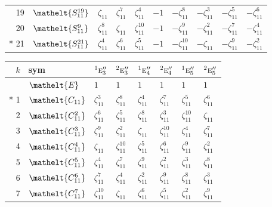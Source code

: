 \documentclass[10pt,a4paper]{article}
\numberwithin{equation}{section}
\newcommand{\eltfont}[1]{{\let\sigma\eltsigma\mathelt{#1}}}
\newcommand{\irr}[1]{\text{\normalfont\scshape #1}}
\newcommand{\conjpair}[1]{{}^{#1}}
\newcommand{\cls}[1]{\eltfont{#1}}
\newcommand{\rootunity}[1]{\zeta_{#1}}
\begin{document}
{\begin{longtable}{@{}rlllllllll@{}}
19 & $\cls{S_{11}^{19}}$ & $\rootunity{11}$ & $\rootunity{11}^{7}$ & $\rootunity{11}^{4}$ & $-1$ & $-\rootunity{11}^{8}$ & $-\rootunity{11}^{3}$ & $-\rootunity{11}^{5}$ & $-\rootunity{11}^{6}$\\
20 & $\cls{S_{11}^{9}}$ & $\rootunity{11}^{8}$ & $\rootunity{11}$ & $\rootunity{11}^{10}$ & $-1$ & $-\rootunity{11}^{9}$ & $-\rootunity{11}^{2}$ & $-\rootunity{11}^{7}$ & $-\rootunity{11}^{4}$\\*
21 & $\cls{S_{11}^{21}}$ & $\rootunity{11}^{4}$ & $\rootunity{11}^{6}$ & $\rootunity{11}^{5}$ & $-1$ & $-\rootunity{11}^{10}$ & $-\rootunity{11}$ & $-\rootunity{11}^{9}$ & $-\rootunity{11}^{2}$\\
\bottomrule\end{longtable}}
{\small\setlength{\tabcolsep}{4pt}
\begin{longtable}{@{}rlllllll@{}}\toprule
$k$ & sym & $\conjpair{1}\irr{e}_{3}''$ & $\conjpair{2}\irr{e}_{3}''$ & $\conjpair{1}\irr{e}_{4}''$ & $\conjpair{2}\irr{e}_{4}''$ & $\conjpair{1}\irr{e}_{5}''$ & $\conjpair{2}\irr{e}_{5}''$\\\midrule\endhead
\bottomrule\endfoot\endlastfoot
0 & $\cls{E}$ & $1$ & $1$ & $1$ & $1$ & $1$ & $1$\\*
1 & $\cls{C_{11}}$ & $\rootunity{11}^{3}$ & $\rootunity{11}^{8}$ & $\rootunity{11}^{4}$ & $\rootunity{11}^{7}$ & $\rootunity{11}^{5}$ & $\rootunity{11}^{6}$\\
2 & $\cls{C_{11}^{2}}$ & $\rootunity{11}^{6}$ & $\rootunity{11}^{5}$ & $\rootunity{11}^{8}$ & $\rootunity{11}^{3}$ & $\rootunity{11}^{10}$ & $\rootunity{11}$\\
3 & $\cls{C_{11}^{3}}$ & $\rootunity{11}^{9}$ & $\rootunity{11}^{2}$ & $\rootunity{11}$ & $\rootunity{11}^{10}$ & $\rootunity{11}^{4}$ & $\rootunity{11}^{7}$\\
4 & $\cls{C_{11}^{4}}$ & $\rootunity{11}$ & $\rootunity{11}^{10}$ & $\rootunity{11}^{5}$ & $\rootunity{11}^{6}$ & $\rootunity{11}^{9}$ & $\rootunity{11}^{2}$\\
5 & $\cls{C_{11}^{5}}$ & $\rootunity{11}^{4}$ & $\rootunity{11}^{7}$ & $\rootunity{11}^{9}$ & $\rootunity{11}^{2}$ & $\rootunity{11}^{3}$ & $\rootunity{11}^{8}$\\
6 & $\cls{C_{11}^{6}}$ & $\rootunity{11}^{7}$ & $\rootunity{11}^{4}$ & $\rootunity{11}^{2}$ & $\rootunity{11}^{9}$ & $\rootunity{11}^{8}$ & $\rootunity{11}^{3}$\\
7 & $\cls{C_{11}^{7}}$ & $\rootunity{11}^{10}$ & $\rootunity{11}$ & $\rootunity{11}^{6}$ & $\rootunity{11}^{5}$ & $\rootunity{11}^{2}$ & $\rootunity{11}^{9}$\\

\end{longtable}}
\end{document}
